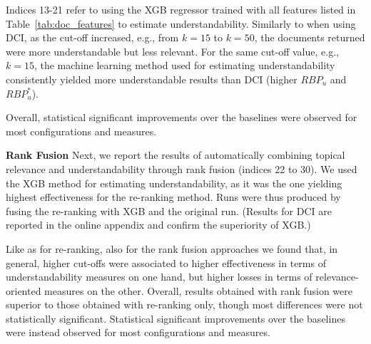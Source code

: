 Indices 13-21 refer to using the XGB regressor trained with all features listed in Table~\ref{tab:doc_features} to estimate understandability. Similarly to when using DCI, as the cut-off increased, e.g., from $k=15$ to $k=50$, the documents returned were more understandable but less relevant. For the same cut-off value, e.g., $k=15$, the machine learning method used for estimating understandability consistently yielded more understandable results than DCI (higher $RBP_u$ and $RBP_u^*$). 

Overall, statistical significant improvements over the baselines were observed for most configurations and measures.  


\textbf{Rank Fusion} Next, we report the results of automatically combining topical relevance and understandability through rank fusion (indices 22 to 30). We used the XGB method for estimating understandability, as it was the one yielding highest effectiveness for the re-ranking method. Runs were thus produced by fusing the re-ranking with XGB and the original run. (Results for DCI are reported in the online appendix and confirm the superiority of XGB.) 

Like as for re-ranking, also for the rank fusion approaches we found that, in general, higher cut-offs were associated to higher effectiveness in terms of understandability measures on one hand, but higher losses in terms of relevance-oriented measures on the other. Overall, results obtained with rank fusion were superior to those obtained with re-ranking only, though most differences were not statistically significant. Statistical significant improvements over the baselines were instead observed for most configurations and measures.  


